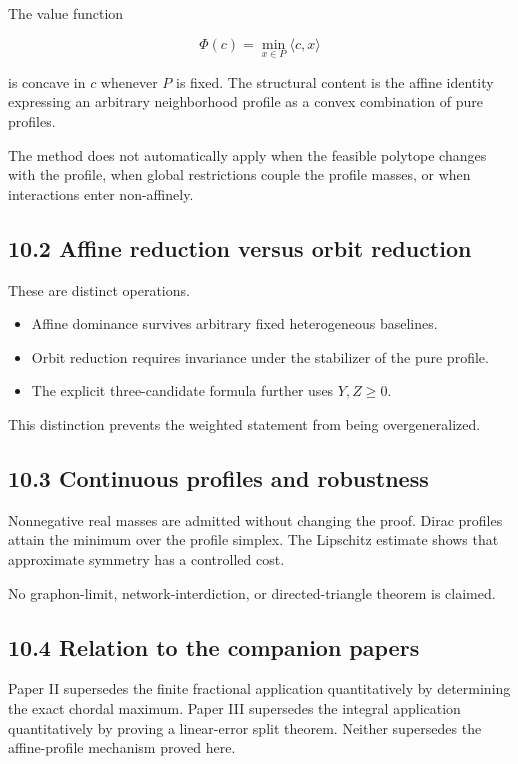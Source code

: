\documentclass[11pt,a4paper]{article}
\providecommand{\tightlist}{\setlength{\itemsep}{0pt}\setlength{\parskip}{0pt}}
\begin{document}
The value function

\[
\Phi(c)=\min_{x\in P}\langle c,x\rangle
\]

is concave in \(c\) whenever \(P\) is fixed. The structural content is the affine identity expressing an arbitrary neighborhood profile as a convex combination of pure profiles.

The method does not automatically apply when the feasible polytope changes with the profile, when global restrictions couple the profile masses, or when interactions enter non-affinely.

\subsection{10.2 Affine reduction versus orbit reduction}\label{affine-reduction-versus-orbit-reduction}

These are distinct operations.

\begin{itemize}
\tightlist
\item
  Affine dominance survives arbitrary fixed heterogeneous baselines.
\item
  Orbit reduction requires invariance under the stabilizer of the pure profile.
\item
  The explicit three-candidate formula further uses \(Y,Z\ge0\).
\end{itemize}

This distinction prevents the weighted statement from being overgeneralized.

\subsection{10.3 Continuous profiles and robustness}\label{continuous-profiles-and-robustness}

Nonnegative real masses are admitted without changing the proof. Dirac profiles attain the minimum over the profile simplex. The Lipschitz estimate shows that approximate symmetry has a controlled cost.

No graphon-limit, network-interdiction, or directed-triangle theorem is claimed.

\subsection{10.4 Relation to the companion papers}\label{relation-to-the-companion-papers-1}

Paper II supersedes the finite fractional application quantitatively by determining the exact chordal maximum. Paper III supersedes the integral application quantitatively by proving a linear-error split theorem. Neither supersedes the affine-profile mechanism proved here.
\end{document}
